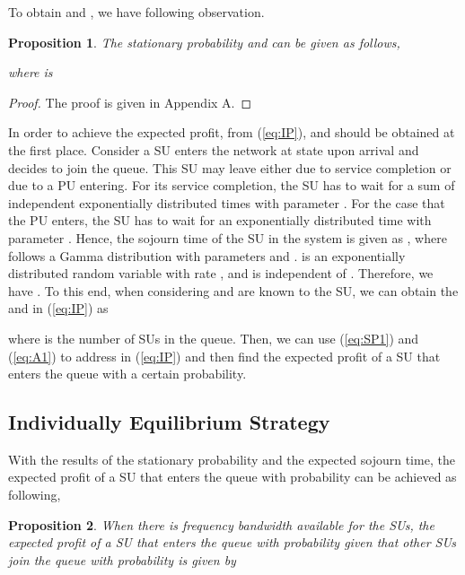 \documentclass[journal]{IEEEtran}
\begin{document}
To obtain  and , we have following observation.

\newtheorem{proposition}{Proposition}
\begin{proposition}
The stationary probability  and  can be given as
follows,



\noindent where  is


\end{proposition}

\begin{proof}
The proof is given in Appendix A.
\end{proof}

In order to achieve the expected profit, from (\ref{eq:IP}),
 and  should be obtained at the first place.
Consider a SU enters the network at state  upon arrival
and decides to join the queue. This SU may leave either due to
service completion or due to a PU entering. For its service
completion, the SU has to wait for a sum of  independent
exponentially distributed times with parameter . For the case
that the PU enters, the SU has to wait for an exponentially distributed
time with parameter . Hence, the sojourn time of the SU in the
system is given as , where  follows a
Gamma distribution with parameters  and .  is an
exponentially distributed random variable with rate , and 
is independent of . Therefore, we have . To this end, when considering  and  are known to the SU,  we can obtain the  and  in
(\ref{eq:IP}) as



\noindent where  is the number of SUs in the queue. Then, we
can use (\ref{eq:SP1}) and (\ref{eq:A1}) to address  in
(\ref{eq:IP}) and then find the expected profit of a SU that enters
the queue with a certain probability.

\subsection{Individually Equilibrium Strategy}

With the results of the stationary probability and the expected
sojourn time, the expected profit of a SU that enters the queue
with probability  can be achieved as following,

\begin{proposition}
When there is frequency bandwidth available for the SUs, the expected
profit of a SU that enters the queue with probability 
given that other SUs join the queue with probability  is given
by

\end{proposition}
\end{document}
